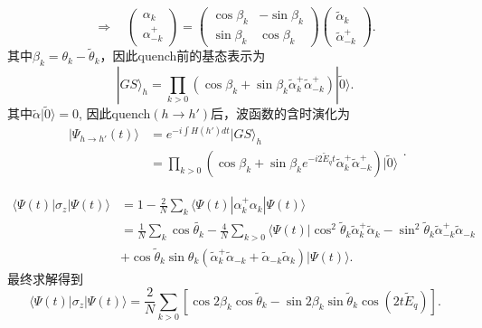 \documentclass[12pt]{article}
\begin{document}
      \begin{equation}\Rightarrow\quad \begin{pmatrix} \alpha_k\\ \alpha_{-k}^+ \end{pmatrix}=\begin{pmatrix} \cos\beta_k&-\sin \beta_k\\ \sin\beta_k&\cos\beta_k \end{pmatrix} \begin{pmatrix} \tilde\alpha_k\\ \tilde\alpha_{-k}^+  \end{pmatrix}  .\end{equation}
      其中$\beta_k=\theta_k-\tilde{\theta}_k$，因此quench前的基态表示为
      \begin{equation}|GS\rangle_h= \prod_{k>0}(\cos\beta_k+\sin\beta_k\tilde{\alpha}_k^+\tilde{\alpha}_{-k}^+)|\tilde{0}\rangle .\end{equation}
      其中$\tilde{\alpha}|\tilde{0}\rangle=0$,  因此quench$(h\to h')$后，波函数的含时演化为
      \begin{equation}\begin{split}|\Psi_{h\to h'}(t)\rangle &=e^{-i\int H(h')dt}|GS\rangle_h \\ &=\prod_{k>0}(\cos\beta_k+\sin\beta_ke^{-i2\tilde{E}_qt}\tilde{\alpha}_k^+\tilde{\alpha}_{-k}^+)|\tilde 0\rangle \end{split}.\end{equation}
      
      
      \begin{equation} \begin{split} \langle\Psi(t)|\sigma_z|\Psi(t)\rangle&=1-\frac{2}{N}\sum_k\langle\Psi(t)|\alpha_k^+\alpha_k|\Psi(t)\rangle\\ &=
      \frac{1}{N}\sum_k\cos\tilde{\theta_k}-\frac{4}{N}\sum_{k>0}\langle\Psi(t)|\cos^2\tilde{\theta}_k\tilde{\alpha}_k^+\tilde{\alpha}_k-\sin^2\tilde\theta_k\tilde\alpha_{-k}^+\tilde\alpha_{-k}\\&+\cos\tilde\theta_k\sin\theta_k(\tilde\alpha_k^+\tilde\alpha_{-k}+\tilde\alpha_{-k}\tilde\alpha_k)|\Psi(t)\rangle. \end{split} \end{equation}
      最终求解得到
      \begin{equation}\langle\Psi(t)|\sigma_z|\Psi(t)\rangle=\frac{2}{N}\sum_{k>0}[\cos2\beta_k\cos\tilde\theta_k-\sin2\beta_k\sin\tilde\theta_k\cos(2t\tilde E_q)] .\end{equation}
      
\end{document}
